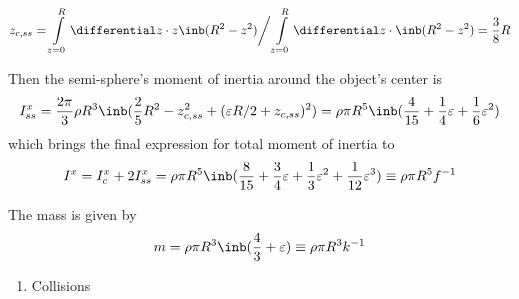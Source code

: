 \begin{equation}
    z_{c,ss} =
    \int\limits_{z=0}^{R}\differential z \cdot z \inb({R^2 - z^2}) \bigg/
    \int\limits_{z=0}^{R}\differential z \cdot \inb({R^2 - z^2}) = \frac{3}{8}R
\end{equation}

Then the semi-sphere's moment of inertia around the object's center is
\begin{equation}
    I_{ss}^x = \frac{2\pi}{3}\rho R^3 \inb({\frac{2}{5}R^2 - z_{c,ss}^2
    + (\varepsilon R / 2 + z_{c,ss})^2}) = \rho \pi R^5
    \inb({\frac{4}{15}+\frac{1}{4}\varepsilon+\frac{1}{6}\varepsilon^2}) 
\end{equation}
which brings the final expression for total moment of inertia to
\begin{equation}
    I^x = I_c^x + 2 I_{ss}^x = \rho \pi R^5
    \inb({\frac{8}{15} + \frac{3}{4}\varepsilon
        + \frac{1}{3}\varepsilon^2 + \frac{1}{12}\varepsilon^3 })
    \equiv \rho \pi R^5 f^{-1}
\end{equation}

The mass is given by
\begin{equation}
    m = \rho \pi R^3 \inb({\frac{4}{3} + \varepsilon}) \equiv \rho \pi R^3 k^{-1}
\end{equation}

{\bfseries
\begin{enumerate}
    \setcounter{enumi}{0}
    \item Collisions
\end{enumerate}
}

